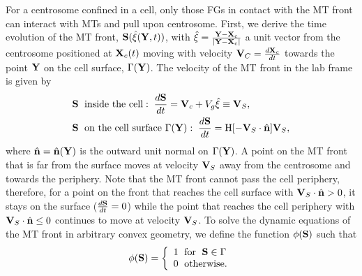 \documentclass[11pt]{article}
\begin{document}
For a centrosome confined in a cell,
only those FGs in contact with the MT front can interact with MTs and pull upon centrosome.
First, we derive the time evolution of the MT front, ${\bf S}(\hat\xi({\bf Y}, t))$, with $\hat\xi=\frac{{\bf Y}-{\bf X}_c}{|{\bf Y}-{\bf X}_c|}$ a unit vector from the centrosome positioned at ${\bf X}_c(t)$ moving with velocity ${\bf V}_C = \frac{d {\bf X}_c}{dt}$ towards the point ${\bf Y}$ on the cell surface, $\Gamma({\bf Y})$. The velocity of the MT front in the lab frame is given by
\begin{align}
\label{eq:MTFront1}
&{\bf S}\;\mbox{ inside the cell}:\; 
\frac{d{\bf S}}{dt} = {\bf V}_c + V_g\hat\xi \equiv {\bf V}_S,\\
\label{eq:MTFront2}
%
&{\bf S}\;\mbox{ on the cell surface } \Gamma({{\bf Y}}):\; 
\frac{d{\bf S}}{dt} = \mbox{H}[-{\bf V}_S\cdot \hat {\bf n}]{\bf V}_S,
\end{align}
where 
$\hat {\bf n} = \hat {\bf n} ({\bf Y})$ is the outward unit normal on $\Gamma({\bf Y})$. 
%
%
A point on the MT front that is far from the surface moves at velocity ${\bf V}_S$ away from the centrosome and towards the periphery. Note that the MT front cannot pass the cell periphery, therefore,  for a point on the front that reaches the cell surface with ${\bf V}_S\cdot{\hat{\bf n}}>0$, it stays on the surface ($\frac{d{\bf S}}{dt}=0$) while the point that reaches the cell  periphery with ${\bf V}_S\cdot{\hat{\bf n}}\le 0$ continues to move at velocity ${\bf V}_S$.
To solve the dynamic equations of the MT front in arbitrary convex geometry, we define the function $\phi({\bf S})$ such that 
\begin{align}
    \phi({\bf S}) = \left\{\begin{array}{l} 1 \; \mbox{ for } \; {\bf S} \in \Gamma \\
    0 \; \mbox{ otherwise}.
    \end{array}\right.
\end{align}
\end{document}
